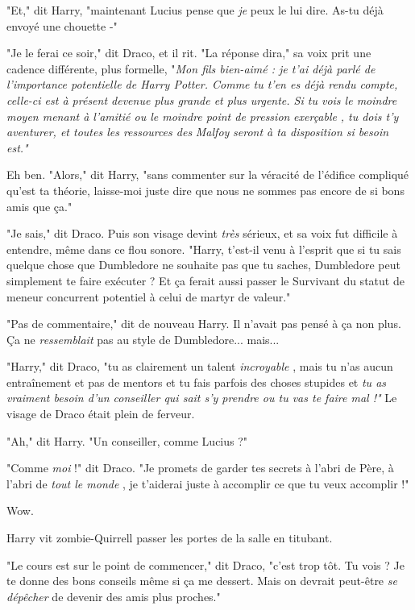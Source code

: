 "Et," dit Harry, "maintenant Lucius pense que \emph{je}  peux le lui dire. As-tu déjà envoyé une chouette -"

"Je le ferai ce soir," dit Draco, et il rit. "La réponse dira," sa voix prit une cadence différente, plus formelle, "\emph{Mon fils bien-aimé : je t'ai déjà parlé de l'importance potentielle de Harry Potter. Comme tu t'en es déjà rendu compte, celle-ci est à présent devenue plus grande et plus urgente. Si tu vois le moindre moyen menant à l'amitié ou le moindre point de pression } \emph{exerçable} \emph{, tu dois t'y aventurer, et toutes les ressources des } \emph{Malfoy } \emph{seront à ta disposition si besoin est."} 

Eh ben. "Alors," dit Harry, "sans commenter sur la véracité de l'édifice compliqué qu'est ta théorie, laisse-moi juste dire que nous ne sommes pas encore de si bons amis que ça."

"Je sais," dit Draco. Puis son visage devint \emph{très}  sérieux, et sa voix fut difficile à entendre, même dans ce flou sonore. "Harry, t'est-il venu à l'esprit que si tu sais quelque chose que Dumbledore ne souhaite pas que tu saches, Dumbledore peut simplement te faire exécuter ? Et ça ferait aussi passer le Survivant du statut de meneur concurrent potentiel à celui de martyr de valeur."

"Pas de commentaire," dit de nouveau Harry. Il n'avait pas pensé à ça non plus. Ça ne \emph{ressemblait}  pas au style de Dumbledore... mais...

"Harry," dit Draco, "tu as clairement un talent \emph{incroyable} , mais tu n'as aucun entraînement et pas de mentors et tu fais parfois des choses stupides et \emph{tu as vraiment besoin d'un conseiller qui sait s'y prendre ou tu vas te faire mal !"}  Le visage de Draco était plein de ferveur.

"Ah," dit Harry. "Un conseiller, comme Lucius ?"

"Comme \emph{moi}  !" dit Draco. "Je promets de garder tes secrets à l'abri de Père, à l'abri de \emph{tout le monde} , je t'aiderai juste à accomplir ce que tu veux accomplir !"

Wow.

Harry vit zombie-Quirrell passer les portes de la salle en titubant.

"Le cours est sur le point de commencer," dit Draco, "c'est trop tôt. Tu vois ? Je te donne des bons conseils même si ça me dessert. Mais on devrait peut-être \emph{se dépêcher}  de devenir des amis plus proches."

